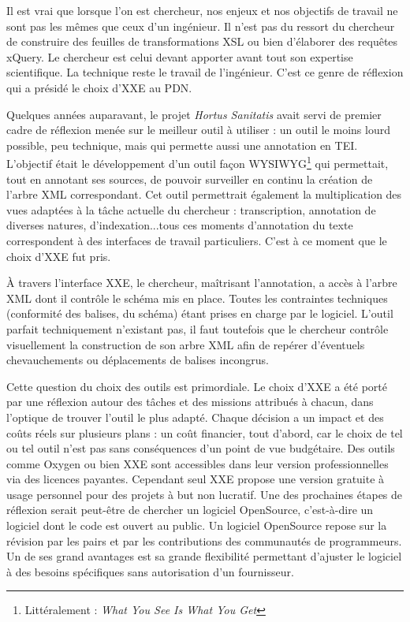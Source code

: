 \documentclass[a4paper,12pt,twoside]{book}
\begin{document}
    Il est vrai que lorsque l'on est chercheur, nos enjeux et nos objectifs de travail ne sont pas les mêmes que ceux d'un ingénieur. Il n'est pas du ressort du chercheur de construire des feuilles de transformations \acrshort{XSL} ou bien d'élaborer des requêtes xQuery. Le chercheur est celui devant apporter avant tout son expertise scientifique. La technique reste le travail de l'ingénieur. C'est ce genre de réflexion qui a présidé le choix d'\acrshort{XXE} au \acrshort{PDN}.
    
    Quelques années auparavant, le projet \textit{Hortus Sanitatis} avait servi de premier cadre de réflexion menée sur le meilleur outil à utiliser : un outil le moins lourd possible, peu technique, mais qui permette aussi une annotation en TEI. L'objectif était le développement d'un outil façon WYSIWYG\footnote{Littéralement : \textit{What You See Is What You Get}} qui permettait, tout en annotant ses sources, de pouvoir surveiller en continu la création de l'arbre XML correspondant. Cet outil permettrait également la multiplication des vues adaptées à la tâche actuelle du chercheur : transcription, annotation de diverses natures, d'indexation...tous ces moments d'annotation du texte correspondent à des interfaces de travail particuliers. C'est à ce moment que le choix d'\acrshort{XXE} fut pris.
    
    À travers l'interface XXE, le chercheur, maîtrisant l'annotation, a accès à l'arbre \acrshort{XML} dont il contrôle le schéma mis en place. Toutes les contraintes techniques (conformité des balises, du schéma) étant prises en charge par le logiciel. L'outil parfait techniquement n'existant pas, il faut toutefois que le chercheur contrôle visuellement la construction de son arbre XML afin de repérer d'éventuels chevauchements ou déplacements de balises incongrus.
    
    Cette question du choix des outils est primordiale. Le choix d'XXE a été porté par une réflexion autour des tâches et des missions attribués à chacun, dans l'optique de trouver l'outil le plus adapté. Chaque décision a un impact et des coûts réels sur plusieurs plans : un coût financier, tout d'abord, car le choix de tel ou tel outil n'est pas sans conséquences d'un point de vue budgétaire. Des outils comme Oxygen ou bien XXE sont accessibles dans leur version professionnelles via des licences payantes. Cependant seul XXE propose une version gratuite à usage personnel pour des projets à but non lucratif. Une des prochaines étapes de réflexion serait peut-être de chercher un logiciel OpenSource, c'est-à-dire un logiciel dont le code est ouvert au public. Un logiciel OpenSource repose sur la révision par les pairs et par les contributions des communautés de programmeurs. Un de ses grand avantages est sa grande flexibilité permettant d'ajuster le logiciel à des besoins spécifiques sans autorisation d'un fournisseur.
    
\end{document}
